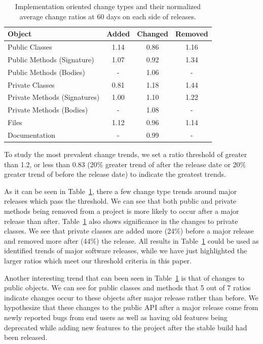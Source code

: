 \documentclass[conference]{IEEEtran}
\begin{document}
\begin{table}[h]
\begin{center}
\tabcolsep=0.11cm
\begin{tabular}{| l | c | c | c |}
\hline
Object & Added & Changed & Removed\\
\hline
Public Classes & 1.14 & 0.86 & 1.16 \\
Public Methods (Signature) & 1.07 & 0.92 & 1.34 \\
Public Methods (Bodies) & - & 1.06 & - \\
Private Classes & 0.81 & 1.18 & 1.44 \\
Private Methods (Signatures) & 1.00 & 1.10 & 1.22 \\
Private Methods (Bodies) & - & 1.08 & - \\
Files & 1.12 & 0.96 & 1.14 \\
Documentation & - & 0.99 & - \\
\hline
\end{tabular}
\end{center}
\caption{Implementation oriented change types and their normalized average change ratios at 60 days on each side of releases. \label{tab:ratio}}
\end{table}

To study the most prevalent change trends, we set a ratio threshold of greater than 1.2, or less than 0.83 (20\% greater trend of after the release date
or 20\% greater trend of before the release date) to indicate the greatest trends.

As it can be seen in Table~\ref{tab:ratio}, there a few change type trends around major releases which pass the threshold. We can see that both public
and private methods
being removed from a project is more likely to occur after a major release than after. Table~\ref{tab:ratio} also shows significance in the changes to private
classes. We see that private classes are added more (24\%) before a major release and removed more after (44\%) the release. 
All results in Table~\ref{tab:ratio} could be used as identified trends of major software releases, while we have just highlighted the larger ratios
which meet our threshold criteria in this paper.

Another interesting trend that can been seen in Table~\ref{tab:ratio} is that of changes to public objects. We can see for public classes and methods that
5 out of 7 ratios indicate changes occur to these objects after major release rather than before. We hypothesize that these changes to the public API
after a major release come from newly reported bugs from end users as well as having old features being deprecated while adding new features to the project
after the stable build had been released.
\end{document}
